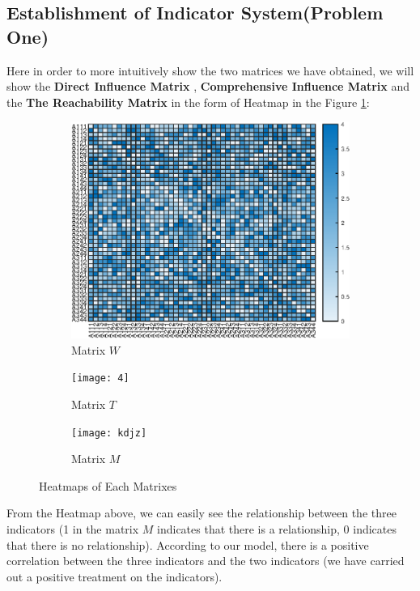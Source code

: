 \documentclass[12pt]{article}  %
\begin{document}
\subsection{Establishment of Indicator System(Problem One)}
Here in order to more intuitively show the two matrices we have obtained, we will show the \textbf{Direct Influence Matrix} , \textbf{Comprehensive Influence Matrix}  and the \textbf{The Reachability Matrix}  in the form of Heatmap in the Figure \ref{heatmap}:
\begin{figure}[htbp]
\centering
\begin{subfigure}[b]{.32\textwidth}
\includegraphics[width=\textwidth]{img/h2.eps}
\caption{Matrix $W$}
\end{subfigure}
\begin{subfigure}[b]{.32\textwidth}
\texttt{[image: 4]}
\caption{Matrix $T$}
\end{subfigure}
\begin{subfigure}[b]{.32\textwidth}
\texttt{[image: kdjz]}
\caption{Matrix $M$}
\end{subfigure}
\caption{Heatmaps of Each Matrixes}
\label{heatmap}
\end{figure}

From the Heatmap above, we can easily see the relationship between the three indicators (1 in the matrix $M$ indicates that there is a relationship, 0 indicates that there is no relationship). According to our model, there is a positive correlation between the three indicators and the two indicators (we have carried out a positive treatment on the indicators).
\end{document}
